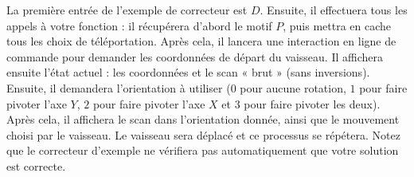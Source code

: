 \documentclass[12pt]{article}
\begin{document}
La première entrée de l'exemple de correcteur est $D$. Ensuite, il effectuera tous les appels à votre fonction : il récupérera d'abord le motif $P$, puis mettra en cache tous les choix de téléportation. Après cela, il lancera une interaction en ligne de commande pour demander les coordonnées de départ du vaisseau. Il affichera ensuite l'état actuel : les coordonnées et le scan « brut » (sans inversions). Ensuite, il demandera l'orientation à utiliser ($0$ pour aucune rotation, $1$ pour faire pivoter l'axe $Y$, $2$ pour faire pivoter l'axe $X$ et $3$ pour faire pivoter les deux). Après cela, il affichera le scan dans l'orientation donnée, ainsi que le mouvement choisi par le vaisseau. Le vaisseau sera déplacé et ce processus se répétera. Notez que le correcteur d'exemple ne vérifiera pas automatiquement que votre solution est correcte.
\end{document}
